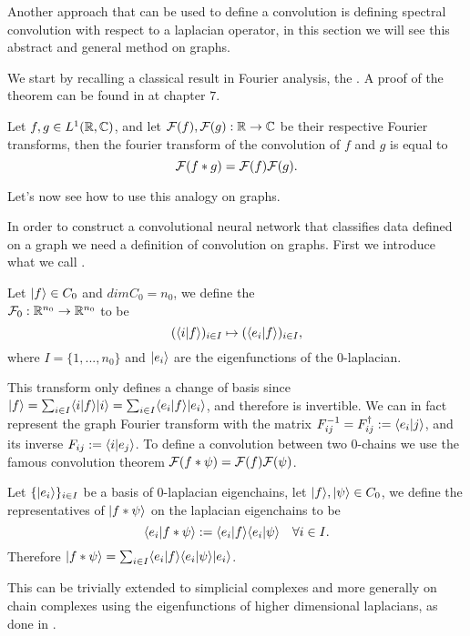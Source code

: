 \documentclass[../3.tex]{subfiles}
\begin{document}
    Another approach that can be used to define a convolution is defining spectral convolution with respect to a laplacian operator, in this section
    we will see this abstract and general method on graphs.

    We start by recalling a classical result in Fourier analysis, the .
    A proof of the theorem can be found in \cite{fourier} at chapter $7$.

    \begin{thm}
        Let $f,g \in L^1(\mathbb{R},\mathbb{C})$, and let $\mathcal{F}(f), \mathcal{F}(g) : \mathbb{R} \to \mathbb{C}$ be their respective Fourier transforms, then the fourier transform of the convolution of $f$ and $g$ is equal to
        \[ \mathcal{F}(f * g) = \mathcal{F}(f)\mathcal{F}(g) . \]
    \end{thm}  
    
    Let's now see how to use this analogy on graphs.

    In order to construct a convolutional neural network that classifies data defined on a graph we need a definition of convolution on graphs.
    First we introduce what we call .
    
    \begin{defn}
        Let $| f \rangle \in C_0$ and $dimC_0 = n_0$, we define the \\
        $\mathcal{F}_0 : \mathbb{R}^{n_0} \to \mathbb{R}^{n_0}$ to be
        \[ (\langle i | f \rangle)_{i \in I} \mapsto (\langle e_i | f \rangle)_{i \in I},\]
        where $I = \{1,...,n_0\}$ and $| e_i \rangle$ are the eigenfunctions of the $0$-laplacian.
    \end{defn}

    This transform only defines a change of basis since $| f \rangle = \sum_{i \in I}\langle i | f \rangle| i \rangle = \sum_{i \in I}\langle e_i | f \rangle| e_i \rangle$, and therefore is invertible.
    We can in fact represent the graph Fourier transform with the matrix $F^{-1}_{ij} = F^\dagger_{ij} := \langle e_i | j \rangle$, and its inverse $F_{ij} := \langle i | e_j \rangle$.
    To define a convolution between two $0$-chains we use the famous convolution theorem $\mathcal{F}(f * \psi) = \mathcal{F}(f)\mathcal{F}(\psi)$. 

    \begin{defn}
        Let $\{| e_i \rangle\}_{i \in I}$ be a basis of $0$-laplacian eigenchains, let $| f \rangle,| \psi \rangle \in C_0$, we define the representatives of $| f * \psi \rangle$ on
        the laplacian eigenchains to be 
        \[ \langle e_i | f * \psi \rangle := \langle e_i | f \rangle\langle e_i | \psi \rangle \quad \forall i \in I.\]
        Therefore $| f * \psi \rangle = \sum_{i \in I}\langle e_i | f \rangle\langle e_i | \psi \rangle| e_i \rangle$.
    \end{defn}

    This can be trivially extended to simplicial complexes and more generally on chain complexes using the eigenfunctions of higher dimensional laplacians, as done in \cite{simplicialNN}.
\end{document}
